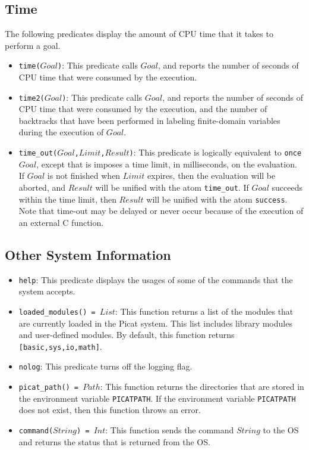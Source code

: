 \subsection{Time}
The following predicates display the amount of CPU time that it takes to perform a goal.
\begin{itemize}
\item \texttt{time($Goal$)}: This predicate calls $Goal$, and reports the number of seconds of CPU time that were consumed by the execution.
\item \texttt{time2($Goal$)}: This predicate calls $Goal$, and reports the number of seconds of CPU time that were consumed by the execution, and the number of backtracks that have been performed in labeling finite-domain variables during the execution of $Goal$.
\item \texttt{time\_out($Goal$,$Limit$,$Result$)}: This predicate is logically equivalent to \texttt{once $Goal$}, except that is imposes a time limit, in milliseconds, on the evaluation.  If $Goal$ is not finished when $Limit$ expires, then the evaluation will be aborted, and $Result$ will be unified with the atom \texttt{time\_out}.  If $Goal$ succeeds within the time limit, then $Result$ will be unified with the atom \texttt{success}. Note that time-out may be delayed or never occur because of the execution of an external C function.
\end{itemize}

\subsection{Other System Information}
\begin{itemize}
\item \texttt{help}: This predicate displays the usages of some of the commands that the system accepts.
\item \texttt{loaded\_modules() = $List$}: This function returns a list of the modules that are currently loaded in the Picat system.  This list includes library modules and user-defined modules.  By default, this function returns \texttt{[basic,sys,io,math]}.
\item \texttt{nolog}: This predicate turns off the logging flag.
\item \texttt{picat\_path() = $Path$}: This function returns the directories that are stored in the environment variable \texttt{PICATPATH}.  If the environment variable \texttt{PICATPATH} does not exist, then this function throws an error.
\item \texttt{command($String$) = $Int$}: This function sends the command $String$ to the OS and returns the status that is returned from the OS.
\end{itemize}

